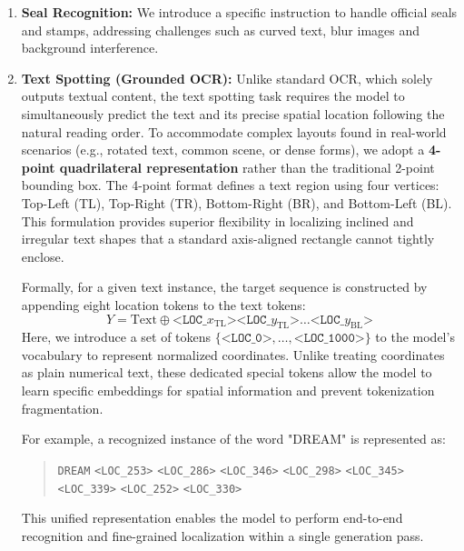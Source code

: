 \documentclass[11pt, a4paper,logo,  copyright, nonumbering]{paddleocr}
\begin{document}
\begin{enumerate}[label=\arabic*.]
    \item \textbf{Seal Recognition:} We introduce a specific instruction to handle official seals and stamps, addressing challenges such as curved text, blur images and background interference.
        
    \item \textbf{Text Spotting (Grounded OCR):} 
    Unlike standard OCR, which solely outputs textual content, the text spotting task requires the model to simultaneously predict the text and its precise spatial location following the natural reading order. To accommodate complex layouts found in real-world scenarios (e.g., rotated text, common scene, or dense forms), we adopt a \textbf{4-point quadrilateral representation} rather than the traditional 2-point bounding box. The 4-point format defines a text region using four vertices: Top-Left (TL), Top-Right (TR), Bottom-Right (BR), and Bottom-Left (BL). This formulation provides superior flexibility in localizing inclined and irregular text shapes that a standard axis-aligned rectangle cannot tightly enclose.
    
    Formally, for a given text instance, the target sequence is constructed by appending eight location tokens to the text tokens:
    \begin{equation}
        Y = \text{Text} \oplus \texttt{<LOC\_}x_{\text{TL}}\texttt{>} \texttt{<LOC\_}y_{\text{TL}}\texttt{>} \dots \texttt{<LOC\_}y_{\text{BL}}\texttt{>}
    \end{equation}
    Here, we introduce a set of tokens $\{\texttt{<LOC\_0>}, \dots, \texttt{<LOC\_1000>}\}$ to the model's vocabulary to represent normalized coordinates. Unlike treating coordinates as plain numerical text, these dedicated special tokens allow the model to learn specific embeddings for spatial information and prevent tokenization fragmentation.
    
    For example, a recognized instance of the word "DREAM" is represented as:
    \begin{quote}
    \small
        \texttt{DREAM} \texttt{<LOC\_253>} \texttt{<LOC\_286>} \texttt{<LOC\_346>} \texttt{<LOC\_298>} \texttt{<LOC\_345>} \texttt{<LOC\_339>} \texttt{<LOC\_252>} \texttt{<LOC\_330>}
    \end{quote}
    This unified representation enables the model to perform end-to-end recognition and fine-grained localization within a single generation pass.
\end{enumerate}
\end{document}
